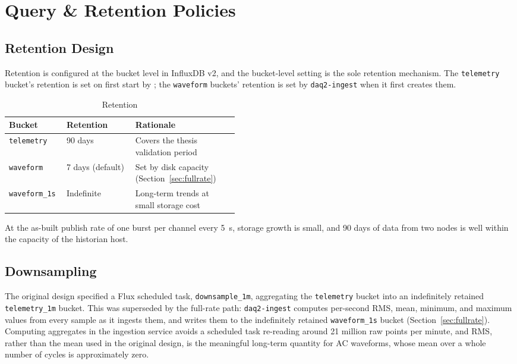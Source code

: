 \section{Query \& Retention Policies}
\subsection{Retention Design}
Retention is configured at the bucket level in InfluxDB v2, and the bucket-level setting is the sole retention mechanism. The \texttt{telemetry} bucket's retention is set on first start by ; the \texttt{waveform} buckets' retention is set by \texttt{daq2-ingest} when it first creates them.

\begin{table}[H]
  \caption{Retention}
  \begin{center}
    \begin{tabular}{llp{0.45\linewidth}}
      \hline
      \textbf{Bucket} & \textbf{Retention} & \textbf{Rationale}\\
      \hline
      \texttt{telemetry} & 90 days & Covers the thesis validation period \\
      \texttt{waveform} & 7 days (default) & Set by disk capacity (Section~\ref{sec:fullrate}) \\
      \texttt{waveform\_1s} & Indefinite & Long-term trends at small storage cost \\
      \hline
    \end{tabular}
  \end{center}
\end{table}

At the as-built publish rate of one burst per channel every 5~s, storage growth is small, and 90 days of data from two nodes is well within the capacity of the historian host.

\subsection{Downsampling}
\label{sec:downsampling}
The original design specified a Flux scheduled task, \texttt{downsample\_1m}, aggregating the \texttt{telemetry} bucket into an indefinitely retained \texttt{telemetry\_1m} bucket. This was superseded by the full-rate path: \texttt{daq2-ingest} computes per-second RMS, mean, minimum, and maximum values from every sample as it ingests them, and writes them to the indefinitely retained \texttt{waveform\_1s} bucket (Section~\ref{sec:fullrate}). Computing aggregates in the ingestion service avoids a scheduled task re-reading around 21 million raw points per minute, and RMS, rather than the mean used in the original design, is the meaningful long-term quantity for AC waveforms, whose mean over a whole number of cycles is approximately zero.

